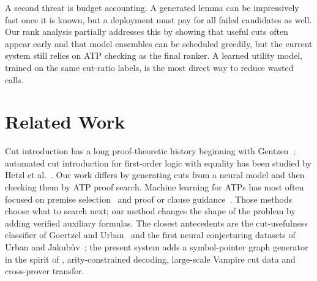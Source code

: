 \documentclass{easychair}
\newcommand{\Vampire}{Vampire\xspace}
\begin{document}
A second threat is budget accounting.  A generated lemma can be
impressively fast once it is known, but a deployment must pay for all
failed candidates as well.  Our rank analysis partially addresses this
by showing that useful cuts often appear early and that model ensembles
can be scheduled greedily, but the current system still relies on ATP
checking as the final ranker.  A learned utility model, trained on the
same cut-ratio labels, is the most direct way to reduce wasted calls.


\section{Related Work}

Cut introduction has a long proof-theoretic history beginning with
Gentzen~\cite{Gentzen1935}; automated cut introduction for first-order
logic with equality has been studied by Hetzl et al.~\cite{Hetzl2014}.
Our work differs by generating cuts from a neural model and then
checking them by ATP proof search.  Machine learning for ATPs has most
often focused on premise selection~\cite{KaliszykU2015} and proof or
clause guidance~\cite{KaliszykUrban2015FEMaLeCoP,JakubuvUrban2017ENIGMA,Loos2017,Jakubuv2019,Suda2021,RawsonReger2021lazyCoP,Chvalovsky2023}.
Those methods choose what to search next; our method changes the shape
of the problem by adding verified auxiliary formulas.  The closest
antecedents are the cut-usefulness classifier of Goertzel and
Urban~\cite{Urban2019} and the first neural conjecturing datasets of
Urban and Jakub\r{u}v~\cite{Urban2020}; the present system adds a
symbol-pointer graph generator in the spirit of \cite{PiepenbrockUrbanKorovinOlsakHeskesJanota2025}, arity-constrained decoding, large-scale
\Vampire cut data and cross-prover transfer.
\end{document}
